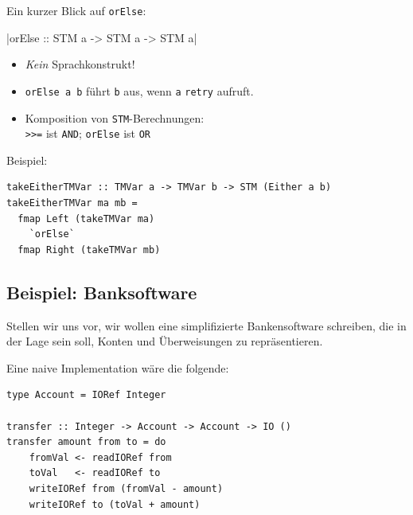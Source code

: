 \documentclass{beamer}
\begin{document}
\begin{frame}[fragile]

Ein kurzer Blick auf \texttt{orElse}:

|orElse :: STM a -> STM a -> STM a|
\pause

\begin{itemize}
\item \emph{Kein} Sprachkonstrukt!\pause
\item \texttt{orElse a b} führt \texttt{b} aus, wenn \texttt{a} \texttt{retry} aufruft.\pause
\item Komposition von \texttt{STM}-Berechnungen:\\
\texttt{>>=} ist \texttt{AND}; \texttt{orElse} ist \texttt{OR}
\end{itemize}
\pause
\smallskip

Beispiel:\smallskip
\begin{verbatim}
takeEitherTMVar :: TMVar a -> TMVar b -> STM (Either a b)
takeEitherTMVar ma mb =
  fmap Left (takeTMVar ma)
    `orElse`
  fmap Right (takeTMVar mb)
\end{verbatim}
\end{frame}


\subsection{Beispiel: Banksoftware}

\begin{frame}[fragile]

Stellen wir uns vor, wir wollen eine simplifizierte Bankensoftware schreiben, die in der Lage sein soll, Konten und Überweisungen zu repräsentieren.\pause\bigskip

Eine naive Implementation wäre die folgende:

\begin{verbatim}
type Account = IORef Integer
 
transfer :: Integer -> Account -> Account -> IO ()
transfer amount from to = do
    fromVal <- readIORef from
    toVal   <- readIORef to
    writeIORef from (fromVal - amount)
    writeIORef to (toVal + amount)
\end{verbatim}
\end{frame}

\end{document}
